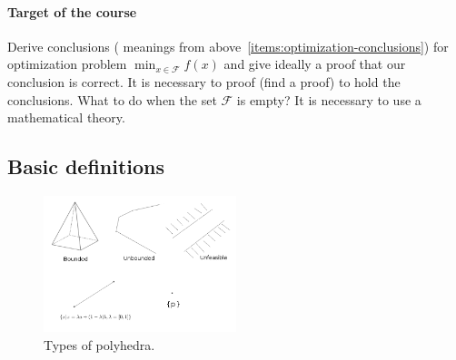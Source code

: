 \documentclass[main]{subfiles}
\begin{document}
\paragraph{Target of the course}
Derive conclusions ( meanings from above~\ref{items:optimization-conclusions})
for optimization problem $\displaystyle \min_{x \in \mathcal{F}} f(x)$ and give
ideally a proof that our conclusion is correct. It is necessary to proof (find
a proof) to hold the conclusions. What to do when the set $\mathcal{F}$ is
empty? It is necessary to use a mathematical theory.

\subsection{Basic definitions}
\begin{figure}[!h]
  \label{fig:convex-set}
  \caption{Types of polyhedra.}
  \centering
    \includegraphics[width=0.5\textwidth]{imgs/polyhedra-types.png}
\end{figure}
\end{document}
